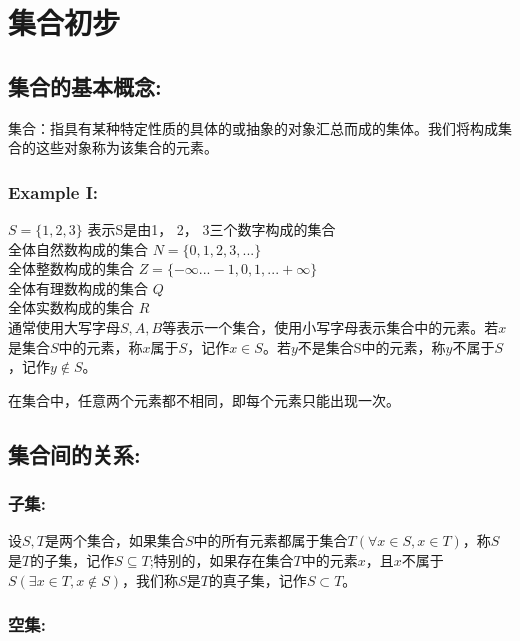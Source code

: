 \documentclass[UTF8]{article}
\begin{document}
  

\section{集合初步}

\subsection{集合的基本概念:}

集合：指具有某种特定性质的具体的或抽象的对象汇总而成的集体。我们将构成集合的这些对象称为该集合的元素。

\subsubsection{Example I:}
$S = \{1, 2, 3\}$ 表示S是由1， 2， 3三个数字构成的集合\\

全体自然数构成的集合 $N = \{0, 1, 2, 3, ...\}$\\

全体整数构成的集合 $Z = \{-\infty ...  -1, 0, 1,  ... +\infty \}$ \\

全体有理数构成的集合 $Q$\\

全体实数构成的集合 $R$\\

通常使用大写字母$S, A, B$等表示一个集合，使用小写字母表示集合中的元素。若$x$是集合$S$中的元素，称$x$属于$S$，记作$x \in S$。若$y$不是集合S中的元素，称$y$不属于$S$，记作$y \notin S$。


在集合中，任意两个元素都不相同，即每个元素只能出现一次。

\subsection{集合间的关系:}

\subsubsection{子集:}

设$S, T$是两个集合，如果集合$S$中的所有元素都属于集合$T(\forall x \in S, x \in T)$，称$S$是$T$的子集，记作$S\subseteq T$;特别的，如果存在集合$T$中的元素$x$，且$x$不属于$S(\exists x \in T, x\notin S)$，我们称$S$是$T$的真子集，记作$S \subset T$。

\subsubsection{空集:}
\end{document}
